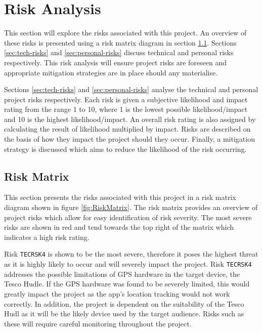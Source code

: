 \documentclass[11pt,a4paper]{article}
\begin{document}
\section{Risk Analysis}
\label{sec:risk-analysis}

This section will explore the risks associated with this project. An overview of these risks is presented using a risk matrix diagram in section \ref{sec:risk-matrix}. Sections \ref{sec:tech-risks} and \ref{sec:personal-risks} discuss technical and personal risks respectively. This risk analysis will ensure project risks are foreseen and appropriate mitigation strategies are in place should any materialise.

Sections \ref{sec:tech-risks} and \ref{sec:personal-risks} analyse the technical and personal project risks respectively. Each risk is given a subjective likelihood and impact rating from the range 1 to 10, where 1 is the lowest possible likelihood/impact and 10 is the highest likelihood/impact. An overall risk rating is also assigned by calculating the result of likelihood multiplied by impact. Risks are described on the basis of how they impact the project should they occur. Finally, a mitigation strategy is discussed which aims to reduce the likelihood of the risk occurring.

\subsection{Risk Matrix}
\label{sec:risk-matrix}

This section presents the risks associated with this project in a risk matrix diagram shown in figure \ref{fig:RiskMatrix}. The risk matrix provides an overview of project risks which allow for easy identification of risk severity. The most severe risks are shown in red and tend towards the top right of the matrix which indicates a high risk rating.

Risk \texttt{TECRSK4} is shown to be the most severe, therefore it poses the highest threat as it is highly likely to occur and will severely impact the project. Risk \texttt{TECRSK4}  addresses the possible limitations of GPS hardware in the target device, the Tesco Hudle. If the GPS hardware was found to be severely limited, this would greatly impact the project as the app's location tracking would not work correctly. In addition, the project is dependent on the suitability of the Tesco Hudl as it will be the likely device used by the target audience. Risks such as these will require careful monitoring throughout the project. 
\end{document}
